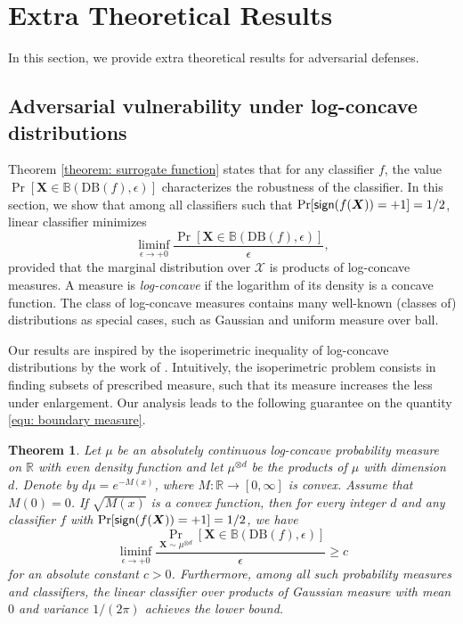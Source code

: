 \documentclass[11pt]{article}
\newcommand{\sign}{\textup{\textsf{sign}}}
\newcommand{\boundary}{\mathrm{DB}}
\newtheorem{theorem}{Theorem}[section]
\newcommand{\R}{\mathbb{R}}
\newcommand{\X}{\bm{X}}
\newcommand{\0}{\mathbf{0}}
\newcommand{\1}{\mathbf{1}}
\newcommand{\cX}{\mathcal{X}}
\newcommand{\bbB}{\mathbb{B}}
\begin{document}
\section{Extra Theoretical Results}
In this section, we provide extra theoretical results for adversarial defenses.






\subsection{Adversarial vulnerability under log-concave distributions}




Theorem \ref{theorem: surrogate function} states that for any classifier $f$, the value
$\Pr[\X\in\bbB(\boundary(f),\epsilon)]$
characterizes the robustness of the classifier.
In this section, we show that among all classifiers such that $\Pr[\sign(f(\X))=+1]=1/2$, linear classifier minimizes
\begin{equation}
\label{equ: boundary measure}
\liminf_{\epsilon\rightarrow+0}\frac{\Pr[\X\in\bbB(\boundary(f),\epsilon)]}{\epsilon},
\end{equation}
provided that the marginal distribution over $\cX$ is products of log-concave measures. A measure is \emph{log-concave} if the logarithm of its density is a concave function. The class of log-concave measures contains many well-known (classes of) distributions as special cases, such as Gaussian and uniform measure over ball.




Our results are inspired by the isoperimetric inequality of log-concave distributions by the work of \cite{barthe2001extremal}. Intuitively, the isoperimetric problem consists in finding subsets of prescribed measure, such that its measure increases the less under enlargement. Our analysis leads to the following guarantee on the quantity \eqref{equ: boundary measure}.


\begin{theorem}
\label{theorem: vulnerability}
Let $\mu$ be an absolutely continuous log-concave probability measure on $\R$ with even density function and let $\mu^{\otimes d}$ be the products of $\mu$ with dimension $d$. Denote by $d\mu=e^{-M(x)}$, where $M:\R\rightarrow[0,\infty]$ is convex. Assume that $M(0)=0$. If $\sqrt{M(x)}$ is a convex function, then for every integer $d$ and any classifier $f$ with $\Pr[\sign(f(\X))=+1]=1/2$, we have
\begin{equation*}
\liminf_{\epsilon\rightarrow+0}\frac{\Pr_{\X\sim \mu^{\otimes d}}[\X\in\bbB(\boundary(f),\epsilon)]}{\epsilon}\ge c
\end{equation*}
for an absolute constant $c>0$. Furthermore, among all such probability measures and classifiers, the linear classifier over products of Gaussian measure with mean $0$ and variance $1/(2\pi)$ achieves the lower bound.
\end{theorem}
\end{document}
